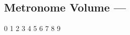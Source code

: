 \subsection[Metronome Volume]{Metronome Volume --- \UiKey{\SET}}









































0
1
2
3
4
5
6
7
8
9
